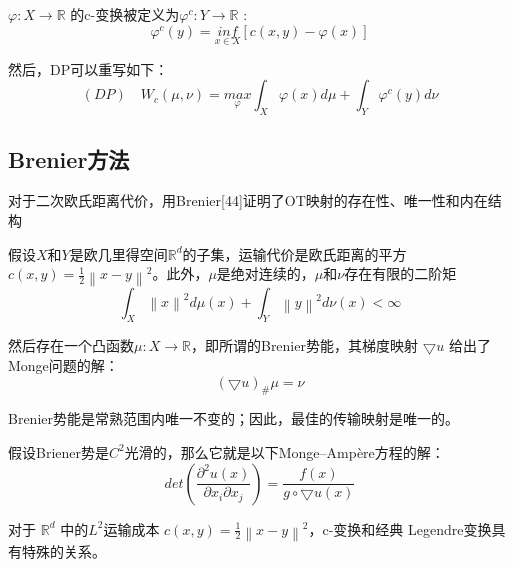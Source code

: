 \begin{definition}[c-转换]	\label{definition:3.3}
	$\varphi: X\to \mathbb{R}$ 的c-变换被定义为$\varphi ^ c: Y \to \mathbb{R}$ :
	\begin{equation}
			\varphi ^c(y)= \underset{x \in X }{inf}\left [ c(x,y)-\varphi(x) \right ]
		\label{function:9}
	\end{equation}
	   
	然后，DP可以重写如下：
	\begin{equation}
		(DP) \quad W_c(\mu , \nu) = \underset{\varphi }{max} \int_X \varphi (x)d\mu +\int _Y \varphi ^c (y)d\nu
		\label{function:10}
	\end{equation}
\end{definition}

\subsection{Brenier方法}

对于二次欧氏距离代价，用Brenier[44]证明了OT映射的存在性、唯一性和内在结构
\begin{theorem}[Brenier【44】]	\label{theorem:3.1}
	假设$X$和$Y$是欧几里得空间$\mathbb{R}^d$的子集，运输代价是欧氏距离的平方$c(x,y)=\frac{1}{2}\left \| x-y \right \| ^2 $。此外，$\mu$是绝对连续的，$\mu$和$\nu$存在有限的二阶矩
	\begin{equation}
		\int _X \left \| x \right \| ^2 d\mu(x) + \int _Y \left \| y \right \| ^2 d\nu(x) < \infty 
		\label{function:11}
	\end{equation}
	
	然后存在一个凸函数$\mu : X \to \mathbb{R}$，即所谓的Brenier势能，其梯度映射 $\bigtriangledown u$ 给出了Monge问题的解：
	\begin{equation}
		(\bigtriangledown u)_{\#} \mu = \nu
		\label{function:12}
	\end{equation}

	 Brenier势能是常熟范围内唯一不变的；因此，最佳的传输映射是唯一的。
	 
	 假设Briener势是$C^2$光滑的，那么它就是以下Monge–Ampère方程的解：
	 \begin{equation}
	 	det(\frac{\partial ^2 u(x)}{\partial x_i \partial x_j})=\frac{f(x)}{g \circ \bigtriangledown u(x)}
	 	\label{function:13}
	 \end{equation}
 
	对于 $\mathbb{R}^d$ 中的$L^2$运输成本 $c(x,y)=\frac{1}{2} \left \| x-y \right \|^2  $，c-变换和经典 Legendre变换具有特殊的关系。
\end{theorem}

